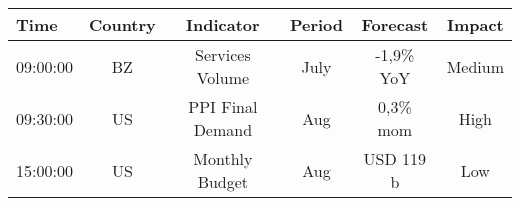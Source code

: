 \documentclass[article,crop=false]{standalone}%
\begin{document}
%
\normalsize%
\setlength{\tabcolsep}{0.15cm}%
\begin{tabular}[h]{l | c c c c c}%
\hline%
\rowcolor{white}%
\textbf{Time}&\textbf{Country}&\textbf{Indicator}&\textbf{Period}&\textbf{Forecast}&\textbf{Impact}\\%
\hline%
\rowcolor{lightgray}%
09:00:00&BZ&Services Volume&July&{-}1,9\% YoY&Medium\\%
\rowcolor{white}%
09:30:00&US&PPI Final Demand&Aug&0,3\% mom&High\\%
\rowcolor{lightgray}%
15:00:00&US&Monthly Budget&Aug&USD 119 b&Low\\%
\hline%
\end{tabular}%
\end{document}
